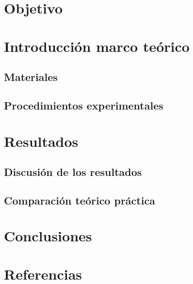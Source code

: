 \documentclass{article}
\begin{document}
\begin{abstract}
	\begin{justify}
		abstract
		Se aprendió y analizo el osciloscopio y el generador de funciones durante la sesión de laboratorio
		\end{justify}
{\it Keywords:}   función, botones 
\end{abstract}
\begin{multicols}{2}
\section{Objetivo}\label{Objetivo}
\section{Introducción marco teórico}\label{sec:intro}
\subsection{Materiales}\label{sec:materiales}
\subsection{Procedimientos experimentales}\label{sec:materiales}
\section{Resultados}\label{sec:resEsperados}
\subsection{Discusión de los resultados}\label{sec:discus}
\subsection{Comparación teórico práctica}\label{sec:comparacion}
\section{Conclusiones}\label{sec:conclusion}
\section*{Referencias}\label{sec:referencias}	
\end{multicols}
\end{document}
